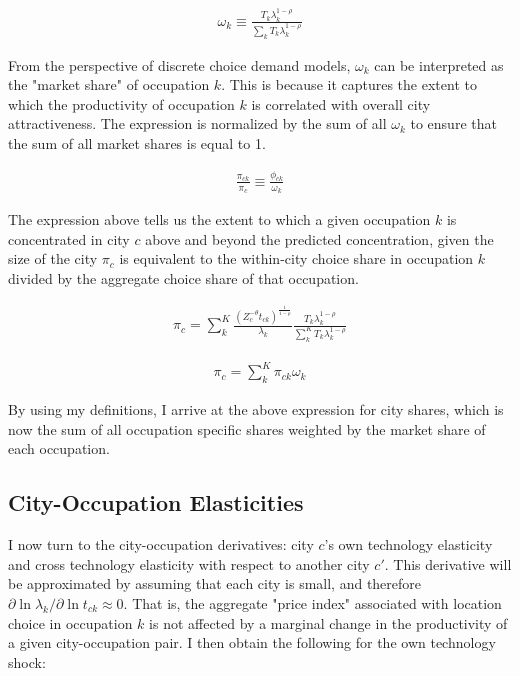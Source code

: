 \documentclass[10pt]{article}
\begin{document}
\begin{align}
    \omega_k \equiv \frac{{T_{k}}\lambda_{k}^{1-\rho}}{\sum\limits_{k}{T_{k}}\lambda_{k}^{1-\rho}}
    \label{occupation_shares}
\end{align}

From the perspective of discrete choice demand models, $\omega_k$ can be interpreted as the "market share" of occupation $k$. This is because it captures the extent to which the productivity of occupation $k$ is correlated with overall city attractiveness. The expression is normalized by the sum of all $\omega_k$ to ensure that the sum of all market shares is equal to 1.

\begin{align}
    \frac{\pi_{ck}}{\pi_c}\equiv \frac{\phi_{ck}}{\omega_k}
    \label{identity}
\end{align}

The expression above tells us the extent to which a given occupation $k$ is concentrated in city $c$ above and beyond the predicted concentration, given the size of the city $\pi_c$ is equivalent to the within-city choice share in occupation $k$ divided by the aggregate choice share of that occupation.

\begin{align*}
    \pi_{c} = \sum_{k}^{K} \frac{(Z_{c}^{-\theta} t_{ck})^{\frac{1}{1-\rho}}}{\lambda_k} \frac{T_k \lambda_{k}^{1 - \rho}}{\sum \limits_{k}^{K} T_k \lambda_{k}^{1-\rho}}
\end{align*}

\begin{align}
    \pi_c = \sum_{k}^{K} \pi_{ck} \omega_k
\end{align}

By using my definitions, I arrive at the above expression for city shares, which is now the sum of all occupation specific shares weighted by the market share of each occupation.

\subsection{City-Occupation Elasticities}

I now turn to the city-occupation derivatives: city $c$'s own technology elasticity and cross technology elasticity with respect to another city $c'$. This derivative will be approximated by assuming that each city is small, and therefore $\partial \ln \lambda_k / \partial \ln t_{ck} \approx 0$. That is, the aggregate "price index" associated with location choice in occupation $k$ is not affected by a marginal change in the productivity of a given city-occupation pair. I then obtain the following for the own technology shock:
\end{document}
